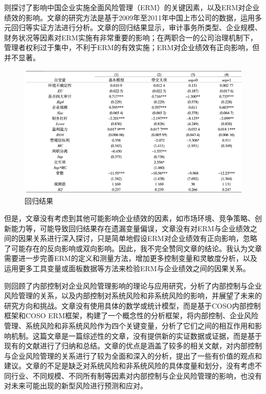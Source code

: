 \documentclass[a4paper,12pt]{ctexart}
\begin{document}
\citet{刘红霞2013中国企业实施全面风险管理}则探讨了影响中国企业实施全面风险管理（ERM）的关键因素，以及ERM对企业绩效的影响。文章的研究方法是基于2009年至2011年中国上市公司的数据，运用多元回归等实证方法进行分析。文章的回归结果显示，审计事务所类型、企业规模、财务状况等因素对ERM实施有非常重要的影响；在两职合一的公司治理机制下，管理者权利过于集中，不利于ERM的有效实施；ERM对企业绩效有正向影响，但并不显著。
\begin{figure}[H]
    \caption{回归结果}
    \centering
    \includegraphics[width=\linewidth]{img/sep.png}
\end{figure}

但是，文章没有考虑到其他可能影响企业绩效的因素，如市场环境、竞争策略、创新能力等，可能导致回归结果存在遗漏变量偏误，文章没有对ERM与企业绩效之间的因果关系进行深入探讨，只是简单地假设ERM对企业绩效有正向影响，忽略了可能存在的反向影响或双向影响。因此，我不完全赞同文章的结论。我认为文章需要进一步完善ERM的定义和测量方法，增加更多控制变量和灵敏度分析，以及运用更多工具变量或面板数据等方法来检验ERM与企业绩效之间的因果关系。

\citet{沈烈2022内部控制对企业风险管理的影响}则回顾了内部控制对企业风险管理影响的理论与应用研究，分析了内部控制与企业风险管理的关系，以及内部控制对系统风险和非系统风险的影响，并展望了未来的研究方向和挑战。文章没有使用具体的数学或统计模型，而是基于COSO内部控制框架和COSO ERM框架，构建了一个概念性的分析框架，将内部控制、企业风险管理、系统风险和非系统风险作为四个关键变量，分析了它们之间的相互作用和影响机制。这篇文章是一篇综述性的文章，没有提供新的实证数据或证据，而是基于现有的文献进行了归纳和总结。文章的优点是涵盖了较多的相关文献，对内部控制与企业风险管理的关系进行了较为全面和深入的分析，提出了一些有价值的观点和建议。文章的不足是缺乏对系统风险和非系统风险的具体度量和划分，没有考虑不同行业、不同规模、不同所有制等因素对内部控制与企业风险管理的影响，也没有对未来可能出现的新型风险进行预测和应对。
\end{document}
